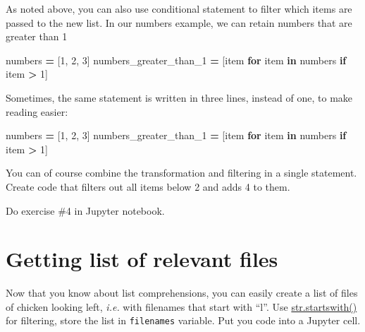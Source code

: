 \documentclass[
]{book}
\newenvironment{Shaded}{\begin{snugshade}}{\end{snugshade}}
\newcommand{\ControlFlowTok}[1]{\textcolor[rgb]{0.13,0.29,0.53}{\textbf{#1}}}
\newcommand{\DecValTok}[1]{\textcolor[rgb]{0.00,0.00,0.81}{#1}}
\newcommand{\KeywordTok}[1]{\textcolor[rgb]{0.13,0.29,0.53}{\textbf{#1}}}
\newcommand{\NormalTok}[1]{#1}
\newcommand{\OperatorTok}[1]{\textcolor[rgb]{0.81,0.36,0.00}{\textbf{#1}}}
\begin{document}
As noted above, you can also use conditional statement to filter which items are passed to the new list. In our numbers example, we can retain numbers that are greater than 1

\begin{Shaded}
\begin{Highlighting}[]
\NormalTok{numbers }\OperatorTok{=}\NormalTok{ [}\DecValTok{1}\NormalTok{, }\DecValTok{2}\NormalTok{, }\DecValTok{3}\NormalTok{]}
\NormalTok{numbers\_greater\_than\_1 }\OperatorTok{=}\NormalTok{ [item }\ControlFlowTok{for}\NormalTok{ item }\KeywordTok{in}\NormalTok{ numbers }\ControlFlowTok{if}\NormalTok{ item }\OperatorTok{\textgreater{}} \DecValTok{1}\NormalTok{]}
\end{Highlighting}
\end{Shaded}

Sometimes, the same statement is written in three lines, instead of one, to make reading easier:

\begin{Shaded}
\begin{Highlighting}[]
\NormalTok{numbers }\OperatorTok{=}\NormalTok{ [}\DecValTok{1}\NormalTok{, }\DecValTok{2}\NormalTok{, }\DecValTok{3}\NormalTok{]}
\NormalTok{numbers\_greater\_than\_1 }\OperatorTok{=}\NormalTok{ [item }
                          \ControlFlowTok{for}\NormalTok{ item }\KeywordTok{in}\NormalTok{ numbers}
                          \ControlFlowTok{if}\NormalTok{ item }\OperatorTok{\textgreater{}} \DecValTok{1}\NormalTok{]}
\end{Highlighting}
\end{Shaded}

You can of course combine the transformation and filtering in a single statement. Create code that filters out all items below 2 and adds 4 to them.

Do exercise \#4 in Jupyter notebook.

\hypertarget{getting-list-of-relevant-files}{%
\section{Getting list of relevant files}\label{getting-list-of-relevant-files}}

Now that you know about list comprehensions, you can easily create a list of files of chicken looking left, \emph{i.e.} with filenames that start with ``l''. Use \href{https://docs.python.org/3/library/stdtypes.html\#str.startswith}{str.startswith()} for filtering, store the list in \texttt{filenames} variable. Put you code into a Jupyter cell.
\end{document}
